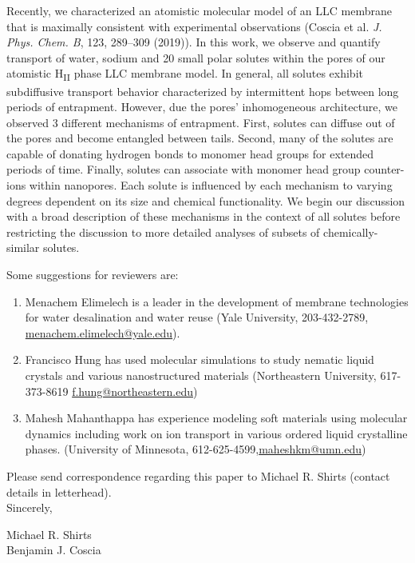 \documentclass[fontsize=11pt]{article}
\begin{document}
        Recently, we characterized an atomistic molecular model of an
        LLC membrane that is maximally consistent with experimental
        observations (Coscia et al. \textit{J. Phys. Chem. B}, 123,
        289--309 (2019)). In this work, we observe and quantify
        transport of water, sodium and 20 small polar solutes within
        the pores of our atomistic H\textsubscript{II} phase LLC
        membrane model. In general, all solutes exhibit subdiffusive
        transport behavior characterized by intermittent hops between
        long periods of entrapment. However, due the pores'
        inhomogeneous architecture, we observed 3 different mechanisms
        of entrapment. First, solutes can diffuse out of the pores and
        become entangled between tails. Second, many of the solutes
        are capable of donating hydrogen bonds to monomer head groups
        for extended periods of time. Finally, solutes can associate
        with monomer head group counter-ions within nanopores. Each
        solute is influenced by each mechanism to varying degrees
        dependent on its size and chemical functionality. We begin our
        discussion with a broad description of these mechanisms in the
        context of all solutes before restricting the discussion to
        more detailed analyses of subsets of chemically-similar
        solutes.
	
	\noindent Some suggestions for reviewers are:
	\begin{enumerate}

		\item Menachem Elimelech is a leader in the development of membrane technologies
		for	water desalination and water reuse (Yale University, 203-432-2789,
		\href{mailto:menachem.elimelech@yale.edu}{menachem.elimelech@yale.edu}).
	
		\item Francisco Hung has used molecular simulations to study nematic liquid crystals
		and various	nanostructured materials (Northeastern University, 617-373-8619 	
		\href{mailto:f.hung@northeastern.edu}{f.hung@northeastern.edu})
		
		\item Mahesh Mahanthappa has experience modeling soft materials using molecular dynamics
		including work on ion transport in various ordered liquid crystalline phases. 
		(University of Minnesota, 612-625-4599,\href{mailto:maheshkm@umn.edu}{maheshkm@umn.edu})
		
	\end{enumerate}
	
	\noindent Please send correspondence regarding this paper to Michael R. Shirts (contact
	details in letterhead).\\	
	
	\noindent Sincerely,
	
	\noindent Michael R. Shirts \\
	\noindent Benjamin J. Coscia \\
	
\end{document}
